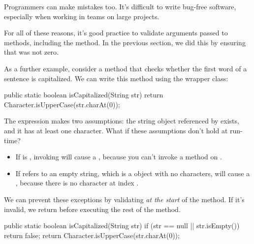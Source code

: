 Programmers can make mistakes too.
It's difficult to write bug-free software, especially when working in teams on large projects.


For all of these reasons, it's good practice to validate arguments passed to methods, including the  method.
In the previous section, we did this by ensuring that  was not zero.


As a further example, consider a method that checks whether the first word of a sentence is capitalized.
We can write this method using the  wrapper class:

\begin{code}
public static boolean isCapitalized(String str) {
    return Character.isUpperCase(str.charAt(0));
}
\end{code}

The expression  makes two assumptions: the string object referenced by  exists, and it has at least one character.
What if these assumptions don't hold at run-time?


\begin{itemize}

\item If  is , invoking  will cause a , because you can't invoke a method on .

\item If  refers to an empty string, which is a  object with no characters,  will cause a , because there is no character at index .

\end{itemize}


We can prevent these exceptions by validating  {\em at the start} of the method.
If it's invalid, we return before executing the rest of the method.

\begin{code}
public static boolean isCapitalized(String str) {
    if (str == null || str.isEmpty()) {
        return false;
    }
    return Character.isUpperCase(str.charAt(0));
}
\end{code}

